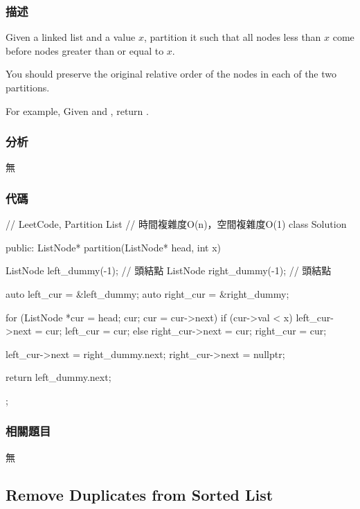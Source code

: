 \subsubsection{描述}
Given a linked list and a value $x$, partition it such that all nodes less than $x$ come before nodes greater than or equal to $x$.

You should preserve the original relative order of the nodes in each of the two partitions.

For example,
Given  and , return .


\subsubsection{分析}
無


\subsubsection{代碼}
\begin{Code}
// LeetCode, Partition List
// 時間複雜度O(n)，空間複雜度O(1)
class Solution {
public:
    ListNode* partition(ListNode* head, int x) {
        ListNode left_dummy(-1); // 頭結點
        ListNode right_dummy(-1); // 頭結點

        auto left_cur = &left_dummy;
        auto right_cur = &right_dummy;

        for (ListNode *cur = head; cur; cur = cur->next) {
            if (cur->val < x) {
                left_cur->next = cur;
                left_cur = cur;
            } else {
                right_cur->next = cur;
                right_cur = cur;
            }
        }

        left_cur->next = right_dummy.next;
        right_cur->next = nullptr;

        return left_dummy.next;
    }
};
\end{Code}


\subsubsection{相關題目}

\begindot
\item 無
\myenddot


\subsection{Remove Duplicates from Sorted List}
\label{sec:remove-duplicates-from-sorted-list}


